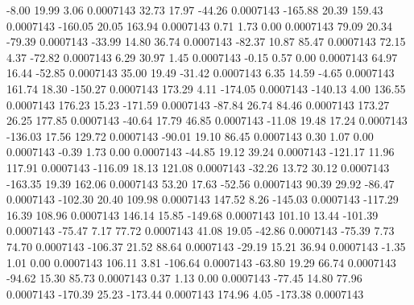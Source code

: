        -8.00       19.99        3.06     0.0007143
       32.73       17.97      -44.26     0.0007143
     -165.88       20.39      159.43     0.0007143
     -160.05       20.05      163.94     0.0007143
        0.71        1.73        0.00     0.0007143
       79.09       20.34      -79.39     0.0007143
      -33.99       14.80       36.74     0.0007143
      -82.37       10.87       85.47     0.0007143
       72.15        4.37      -72.82     0.0007143
        6.29       30.97        1.45     0.0007143
       -0.15        0.57        0.00     0.0007143
       64.97       16.44      -52.85     0.0007143
       35.00       19.49      -31.42     0.0007143
        6.35       14.59       -4.65     0.0007143
      161.74       18.30     -150.27     0.0007143
      173.29        4.11     -174.05     0.0007143
     -140.13        4.00      136.55     0.0007143
      176.23       15.23     -171.59     0.0007143
      -87.84       26.74       84.46     0.0007143
      173.27       26.25      177.85     0.0007143
      -40.64       17.79       46.85     0.0007143
      -11.08       19.48       17.24     0.0007143
     -136.03       17.56      129.72     0.0007143
      -90.01       19.10       86.45     0.0007143
        0.30        1.07        0.00     0.0007143
       -0.39        1.73        0.00     0.0007143
      -44.85       19.12       39.24     0.0007143
     -121.17       11.96      117.91     0.0007143
     -116.09       18.13      121.08     0.0007143
      -32.26       13.72       30.12     0.0007143
     -163.35       19.39      162.06     0.0007143
       53.20       17.63      -52.56     0.0007143
       90.39       29.92      -86.47     0.0007143
     -102.30       20.40      109.98     0.0007143
      147.52        8.26     -145.03     0.0007143
     -117.29       16.39      108.96     0.0007143
      146.14       15.85     -149.68     0.0007143
      101.10       13.44     -101.39     0.0007143
      -75.47        7.17       77.72     0.0007143
       41.08       19.05      -42.86     0.0007143
      -75.39        7.73       74.70     0.0007143
     -106.37       21.52       88.64     0.0007143
      -29.19       15.21       36.94     0.0007143
       -1.35        1.01        0.00     0.0007143
      106.11        3.81     -106.64     0.0007143
      -63.80       19.29       66.74     0.0007143
      -94.62       15.30       85.73     0.0007143
        0.37        1.13        0.00     0.0007143
      -77.45       14.80       77.96     0.0007143
     -170.39       25.23     -173.44     0.0007143
      174.96        4.05     -173.38     0.0007143
